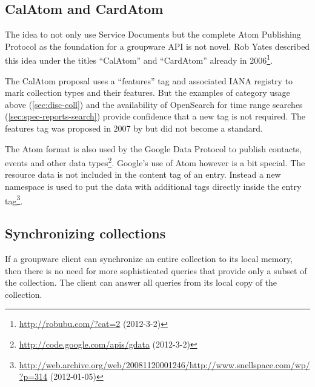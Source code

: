 \documentclass[11pt,a4paper,headsepline,twoside]{scrartcl}		%
\newcommand{\citeurl}[2]{\url{#1} (#2)}
\begin{document}

\subsection{CalAtom and CardAtom}
\label{sec:atom-publ-prot}

The idea to not only use Service Documents but the complete Atom Publishing
Protocol as the foundation for a groupware API is not novel. Rob Yates described
this idea under the titles ``CalAtom'' and ``CardAtom'' already in
2006\footnote{\citeurl{http://robubu.com/?cat=2}{2012-3-2}}.

The CalAtom \cite{draft-yates-atompub-calatom-00.txt} proposal uses a
``features'' tag and associated IANA registry to mark collection types and their
features. But the examples of category usage above (\autoref{sec:disc-coll}) and
the availability of OpenSearch for time range searches
(\autoref{sec:spec-reports-search}) provide confidence that a new tag is not
required. The features tag was proposed in 2007 by
 \cite{draft-snell-atompub-feature} but did not become a standard.

The Atom format is also used by the Google Data Protocol to publish contacts,
events and other data
types\footnote{\citeurl{http://code.google.com/apis/gdata}{2012-3-2}}. Google's
use of Atom however is a bit special. The resource data is not included in the
content tag of an entry. Instead a new namespace is used to put the data with
additional tags directly inside the entry
tag\footnote{\citeurl{http://web.archive.org/web/20081120001246/http://www.snellspace.com/wp/?p=314}{2012-01-05}}.



\subsection{Synchronizing collections}
\label{sec:synchr-coll}

If a groupware client can synchronize an entire collection to its local memory,
then there is no need for more sophisticated queries that provide only a subset
of the collection. The client can answer all queries from its local copy of the
collection.
\end{document}
